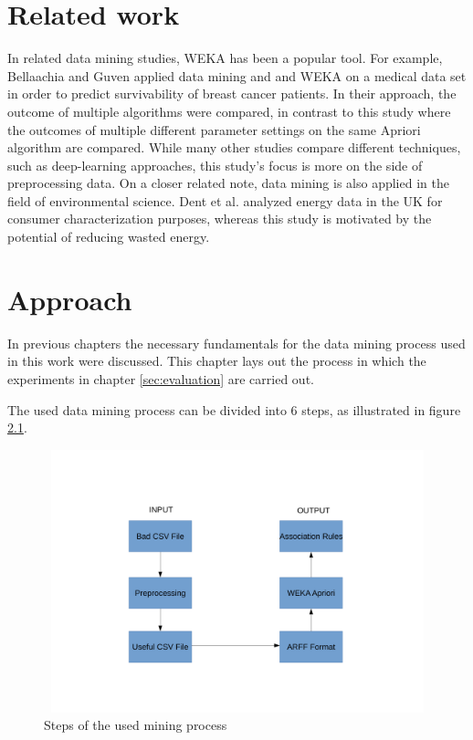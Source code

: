 \documentclass[bachelor,english]{info1thesis}
\begin{document}
\chapter{Related work}
\label{sec:relatedwork}
In related data mining studies, WEKA has been a popular tool. For example, Bellaachia and Guven \cite{bellaachia2006predicting} applied data mining and and WEKA on a medical data set in order to predict survivability of  breast cancer patients. In their approach, the outcome of multiple algorithms were compared, in contrast to this study where the outcomes of multiple different parameter settings on the same Apriori algorithm are compared. While many other studies compare different techniques, such as deep-learning approaches, this study's focus is more on the side of preprocessing data.
On a closer related note, data mining is also applied in the field of environmental science. Dent et al. \cite{dent2011application} analyzed energy data in the UK for consumer characterization purposes, whereas this study is motivated by the potential of reducing wasted energy.

\chapter{Approach}
\label{sec:approach}
In previous chapters the necessary fundamentals for the data mining process used in this work were discussed. This chapter lays out the process in which the experiments in chapter \ref{sec:evaluation} are carried out.

The used data mining process can be divided into 6 steps, as illustrated in figure \ref{fig:roughapproach}.

\begin{figure}[htb]
	\begin{center}
		\includegraphics[height=3in,width=4.5in]{abbildungen/approachpdf.pdf}
		\caption{Steps of the used mining process}
			\label{fig:roughapproach}
	\end{center}
\end{figure}
\end{document}
